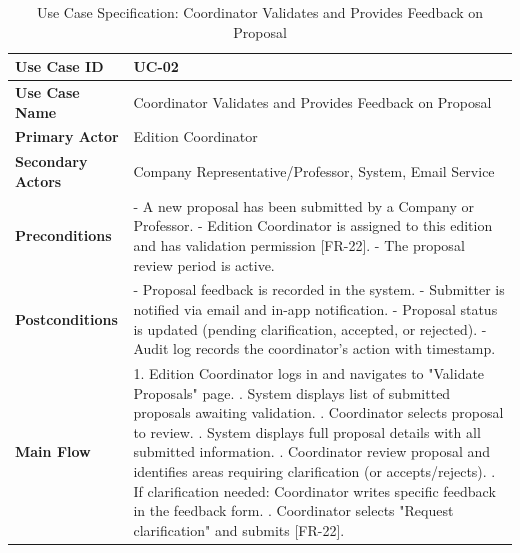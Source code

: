 \newpage
\renewcommand{\arraystretch}{1.5} 
\begin{xltabular}{\textwidth}{|l|X|}
    \caption{Use Case Specification: Coordinator Validates and Provides Feedback on Proposal} \label{tab:UC-02} \\
    
    \hline
    \textbf{Use Case ID} & UC-02 \\ \hline
    \textbf{Use Case Name} & Coordinator Validates and Provides Feedback on Proposal \\ \hline
    \textbf{Primary Actor} & Edition Coordinator \\ \hline
    \textbf{Secondary Actors} & Company Representative/Professor, System, Email Service \\ \hline
    \textbf{Preconditions} &
        - A new proposal has been submitted by a Company or Professor. \newline
        - Edition Coordinator is assigned to this edition and has validation permission [FR-22]. \newline
        - The proposal review period is active.
        \\ \hline
    \textbf{Postconditions} &
        - Proposal feedback is recorded in the system. \newline
        - Submitter is notified via email and in-app notification. \newline
        - Proposal status is updated (pending clarification, accepted, or rejected). \newline
        - Audit log records the coordinator's action with timestamp.
        \\ \hline
    \textbf{Main Flow} &
        1. Edition Coordinator logs in and navigates to "Validate Proposals" page. . System displays list of submitted proposals awaiting validation. . Coordinator selects proposal to review. . System displays full proposal details with all submitted information. . Coordinator review proposal and identifies areas requiring clarification (or accepts/rejects). . If clarification needed: Coordinator writes specific feedback in the feedback form. . Coordinator selects "Request clarification" and submits [FR-22]. \newline

\end{xltabular}
